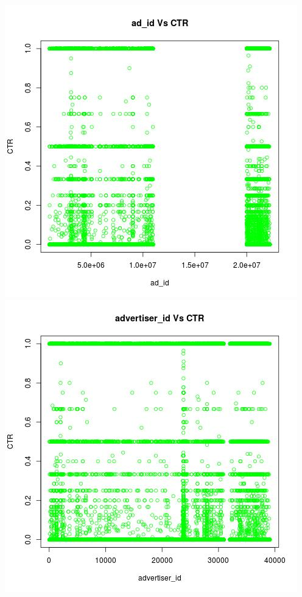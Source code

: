 \documentclass[10pt]{article}
\begin{document}
\includegraphics[scale=0.5]{ad_id_Vs_CTR}
\includegraphics[scale=0.5]{advertiser_id_Vs_CTR}\\\\
\end{document}
